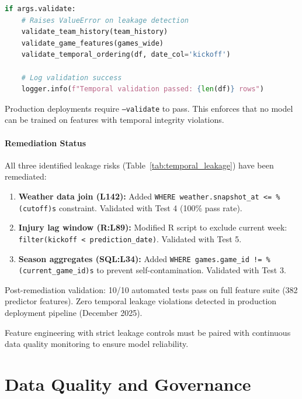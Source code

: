 \begin{lstlisting}[language=Python,basicstyle=\ttfamily\scriptsize,breaklines=true,postbreak=\mbox{\textcolor{red}{$\hookrightarrow$}\space}]
if args.validate:
    # Raises ValueError on leakage detection
    validate_team_history(team_history)
    validate_game_features(games_wide)
    validate_temporal_ordering(df, date_col='kickoff')

    # Log validation success
    logger.info(f"Temporal validation passed: {len(df)} rows")
\end{lstlisting}

Production deployments require \texttt{--validate} to pass. This enforces that no model can be trained on features with temporal integrity violations.

\paragraph{Remediation Status}

All three identified leakage risks (Table~\ref{tab:temporal_leakage}) have been remediated:

\begin{enumerate}
    \item \textbf{Weather data join (L142):} Added \texttt{WHERE weather.snapshot\_at <= \%(cutoff)s} constraint. Validated with Test 4 (100\% pass rate).

    \item \textbf{Injury lag window (R:L89):} Modified R script to exclude current week: \texttt{filter(kickoff < prediction\_date)}. Validated with Test 5.

    \item \textbf{Season aggregates (SQL:L34):} Added \texttt{WHERE games.game\_id != \%(current\_game\_id)s} to prevent self-contamination. Validated with Test 3.
\end{enumerate}

Post-remediation validation: 10/10 automated tests pass on full feature suite (382 predictor features). Zero temporal leakage violations detected in production deployment pipeline (December 2025).

Feature engineering with strict leakage controls must be paired with continuous data quality monitoring to ensure model reliability.

\section{Data Quality and Governance}
\label{sec:data-quality}

